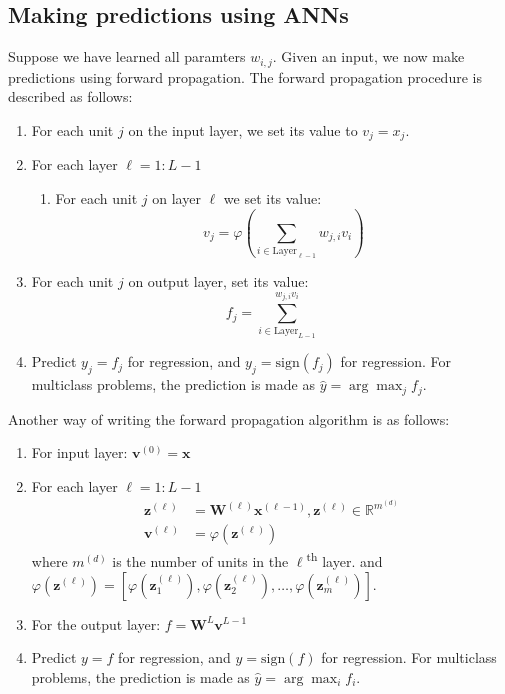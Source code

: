 \documentclass[a4paper,10pt,twoside]{article}
\begin{document}
\subsection{Making predictions using ANNs}
Suppose we have learned all paramters $w_{i,j}$. Given an input, we now make predictions using forward propagation. The forward propagation procedure is described as follows:
\begin{enumerate}
    \item For each unit $j$ on the input layer, we set its value to $v_j=x_j$.
    \item For each layer $\ell=1:L-1$
    \begin{enumerate}
        \item For each unit $j$ on layer $\ell$ we set its value:
        \begin{equation*}
            v_j=\varphi\left(\sum_{i\in\text{Layer}_{\ell-1}}w_{j,i}v_i\right)
        \end{equation*}
    \end{enumerate}
    \item For each unit $j$ on output layer, set its value:
    \begin{equation*}
        f_j=\sum_{i\in\text{Layer}_{L-1}}^{w_{j,i}v_i}
    \end{equation*}
    \item Predict $y_j=f_j$ for regression, and $y_j=\text{sign}(f_j)$ for regression. For multiclass problems, the prediction is made as $\hat{y}=\arg\max_{j}f_j$.
\end{enumerate}

Another way of writing the forward propagation algorithm is as follows:
\begin{enumerate}
    \item For input layer: $\mathbf{v}^{(0)}=\mathbf{x}$
    \item For each layer $\ell=1:L-1$
    \begin{align*}
        \mathbf{z}^{(\ell)} &= \mathbf{W}^{(\ell)}\mathbf{x}^{(\ell-1)}, \mathbf{z}^{(\ell)}\in\mathbb{R}^{m^{(d)}}\\
        \mathbf{v}^{(\ell)} &=\varphi(\mathbf{z}^{(\ell)})
    \end{align*}
    where $m^{(d)}$ is the number of units in the $\ell$\textsuperscript{th} layer. and $\varphi(\mathbf{z}^{(\ell)}) = [\varphi(\mathbf{z}_1^{(\ell)}), \varphi(\mathbf{z}_2^{(\ell)}),\ldots, \varphi(\mathbf{z}_m^{(\ell)})]$.
    \item For the output layer: $f=\mathbf{W}^{L}\mathbf{v}^{L-1}$
    \item Predict $y=f$ for regression, and $y=\text{sign}(f)$ for regression. For multiclass problems, the prediction is made as $\hat{y}=\arg\max_{i}f_i$.
\end{enumerate}
\end{document}
